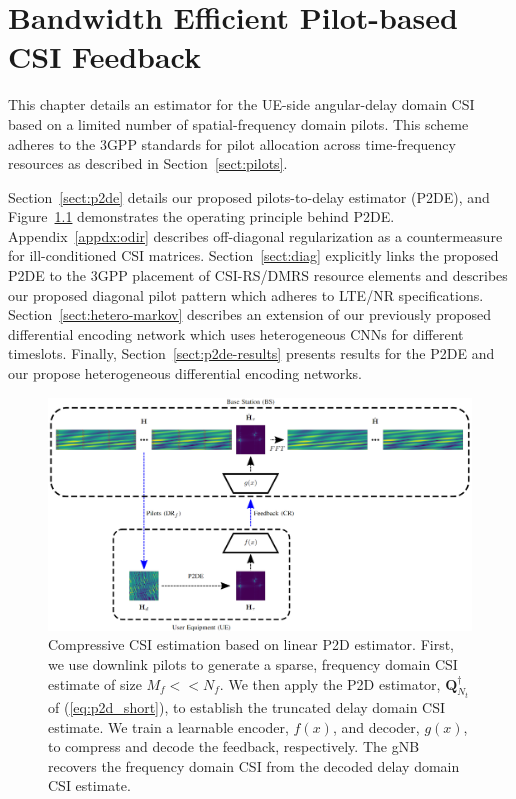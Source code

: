 \chapter{Bandwidth Efficient Pilot-based CSI Feedback}
\label{chap:p2d}

This chapter details an estimator for the UE-side angular-delay domain CSI based on a limited number of spatial-frequency domain pilots. This scheme adheres to the 3GPP standards for pilot allocation across time-frequency resources as described in Section~\ref{sect:pilots}.

Section~\ref{sect:p2de} details our proposed pilots-to-delay estimator (P2DE), and Figure~\ref{fig:p2d} demonstrates the operating principle behind P2DE. Appendix~\ref{appdx:odir} describes off-diagonal regularization as a countermeasure for ill-conditioned CSI matrices. Section~\ref{sect:diag} explicitly links the proposed P2DE to the 3GPP placement of CSI-RS/DMRS resource elements and describes our proposed diagonal pilot pattern which adheres to LTE/NR specifications. Section~\ref{sect:hetero-markov} describes an extension of our previously proposed differential encoding network which uses heterogeneous CNNs for different timeslots. Finally, Section~\ref{sect:p2de-results} presents results for the P2DE and our propose heterogeneous differential encoding networks.

\begin{figure}[!hbtp]
    \centering
    \includegraphics[width=\linewidth]{./images/00_downlink_p2d_feedback_horiz_diag.png}
    \caption{Compressive CSI estimation based on linear P2D estimator. First,
    we use downlink pilots to 
    generate a sparse, frequency domain CSI
    estimate 
    of size $M_f << N_f$. We then apply
    the P2D estimator, $\mathbf{Q}^\dag_{N_t}$ of (\ref{eq:p2d_short}), to establish 
    the truncated
    delay domain CSI estimate.
    We train a
    learnable encoder, 
    $f(x)$,
    and decoder, $g(x)$, to compress and decode the feedback, respectively. The 
    gNB recovers
    the frequency domain
    CSI from 
    the decoded 
    delay domain CSI estimate.}
    \label{fig:p2d}
\end{figure}

